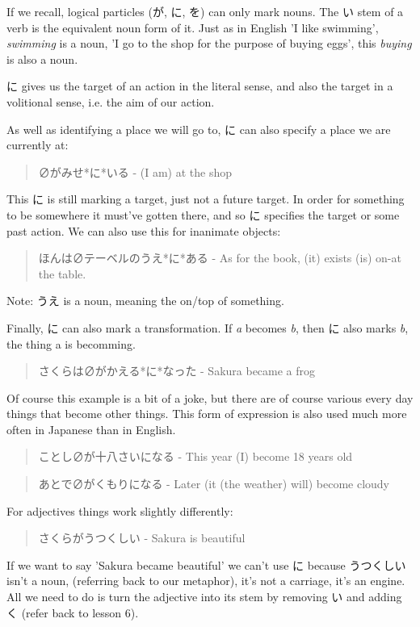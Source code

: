 \documentclass[11pt]{article}
\begin{document}
If we recall, logical particles (が, に, を) can only mark nouns. The い stem of a verb is the equivalent noun form of it. Just as in English 'I like swimming', \emph{swimming} is a noun, 'I go to the shop for the purpose of buying eggs', this \emph{buying} is also a noun.

に gives us the target of an action in the literal sense, and also the target in a volitional sense, i.e. the aim of our action.

As well as identifying a place we will go to, に can also specify a place we are currently at:
\begin{quote}
∅がみせ*に*いる - (I am) at the shop
\end{quote}
This に is still marking a target, just not a future target. In order for something to be somewhere it must've gotten there, and so に specifies the target or some past action. We can also use this for inanimate objects:
\begin{quote}
ほんは∅テーベルのうえ*に*ある - As for the book, (it) exists (is) on-at the table.
\end{quote}
Note: うえ is a noun, meaning the on/top of something.

Finally, に can also mark a transformation. If \emph{a} becomes \emph{b}, then に also marks \emph{b}, the thing a is becomming.

\begin{quote}
さくらは∅がかえる*に*なった - Sakura became a frog
\end{quote}
Of course this example is a bit of a joke, but there are of course various every day things that become other things. This form of expression is also used much more often in Japanese than in English.
\begin{quote}
ことし∅が十八さいになる - This year (I) become 18 years old
\end{quote}
\begin{quote}
あとで∅がくもりになる - Later (it (the weather) will) become cloudy
\end{quote}

For adjectives things work slightly differently:
\begin{quote}
さくらがうつくしい - Sakura is beautiful
\end{quote}
If we want to say 'Sakura became beautiful' we can't use に because うつくしい isn't a noun, (referring back to our metaphor), it's not a carriage, it's an engine. All we need to do is turn the adjective into its stem by removing い and adding く (refer back to lesson 6).
\end{document}
